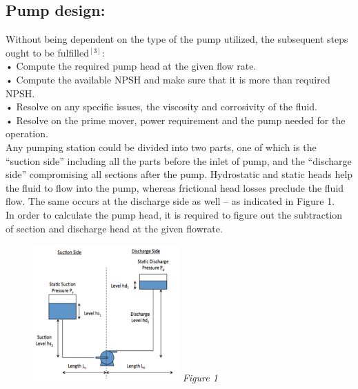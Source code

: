 \documentclass[12pt]{article}
\begin{document}
      \subsection{Pump design: }
      {\fontsize{12pt}{12pt}

      \hspace*{1em} Without being dependent on the type of the pump utilized, the subsequent steps ought to be fulfilled$^{[3]}$: \\
      \hspace*{1em } •	Compute the required pump head at the given flow rate. \\
      \hspace*{1em} •	Compute the available NPSH and make sure that it is more than required NPSH. \\
      \hspace*{1em} •	Resolve on any specific issues, the viscosity and corrosivity of the fluid. \\
      \hspace*{1em} •	Resolve on the prime mover, power requirement and the pump needed for the operation. \\

Any pumping station could be divided into two parts, one of which is the “suction side” including all the parts before the inlet of pump, and the “discharge side” compromising all sections after the pump. Hydrostatic and static heads help the fluid to flow into the pump, whereas frictional head losses preclude the fluid flow. The same occurs at the discharge side as well – as indicated in Figure 1.\\
In order to calculate the pump head, it is required to figure out the subtraction of section and discharge head at the given flowrate. \\




\begin{figure}[H]
  \centering
  \includegraphics[width=0.5\textwidth]{assets/images/p_sys.png}
  \textit{Figure 1}
  

\end{figure}}
\end{document}
